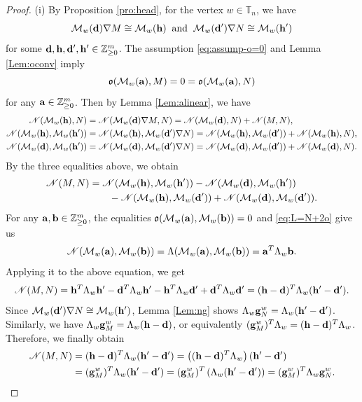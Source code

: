 \documentclass[12pt]{amsart}
\theoremstyle{definition}
\theoremstyle{remark}
\numberwithin{equation}{section}
\begin{document}
\begin{proof}
(i) By Proposition \ref{pro:head},  for the vertex $w\in\mathbb T_n$, we have 
\[
\mathcal{M}_{w}({\bf d}) \nabla M \cong \mathcal{M}_{w}({\bf h}) \;\; \text{and}\;\;\mathcal{M}_w({\bf d}') \nabla N \cong \mathcal{M}_{w}({\bf h}')
\]
for some ${\bf d,h,d',h'} \in \mathbb{Z}_{\ge 0}^m$.
The assumption \eqref{eq:assump-o=0} and Lemma \ref{Lem:oconv} imply \[\mathfrak{o}(\mathcal M_w({\bf a}), M)=0=\mathfrak{o}(\mathcal M_w({\bf a}), N)\] for any ${\bf a}\in\mathbb Z_{\geq 0}^m$.  Then by Lemma \ref{Lem:alinear}, we have
\begin{align}
  \mathscr{N}(\mathcal{M}_{w}({\bf h}),N) &=\mathscr{N}(\mathcal{M}_{w}({\bf d}) \nabla M,N)= \mathscr{N}(\mathcal{M}_{w}({\bf d}),N)+ \mathscr{N}(M,N),\nonumber\\
    \mathscr{N}(\mathcal{M}_{w}({\bf h}),\mathcal M_w({\bf h'})) &= \mathscr{N}(\mathcal{M}_{w}({\bf h}),\mathcal M_w({\bf d'})\nabla N)= \mathscr{N}(\mathcal{M}_{w}({\bf h}), \mathcal M_w({\bf d'}))+ \mathscr{N}(\mathcal{M}_{w}({\bf h}), N),\nonumber\\
     \mathscr{N}(\mathcal{M}_{w}({\bf d}),\mathcal M_w({\bf h'})) &= \mathscr{N}(\mathcal{M}_{w}({\bf d}),\mathcal M_w({\bf d'})\nabla N)= \mathscr{N}(\mathcal{M}_{w}({\bf d}), \mathcal M_w({\bf d'}))+ \mathscr{N}(\mathcal{M}_{w}({\bf d}), N).\nonumber
\end{align}
By the three equalities above, we obtain
\begin{align}
    \mathscr{N}(M,N) &= \mathscr{N}(\mathcal{M}_{w}({\bf h}), \mathcal{M}_{w}({\bf h'})) - \mathscr{N}(\mathcal{M}_{w}({\bf d}), \mathcal{M}_{w}({\bf h'})) \nonumber\\
    & \qquad -\mathscr{N}(\mathcal{M}_{w}({\bf h}), \mathcal{M}_{w}({\bf d'})) + \mathscr{N}(\mathcal{M}_{w}({\bf d}), \mathcal{M}_{w}({\bf d'})).\nonumber
\end{align}
For any ${\bf a,b} \in \mathbb{Z}_{\ge 0}^m$, the equalities $\mathfrak{o}(\mathcal{M}_{w}({\bf a}), \mathcal{M}_{w}({\bf b}))=0$ and \eqref{eq:L=N+2o} give us
\[\mathscr{N}(\mathcal{M}_{w}({\bf a}), \mathcal{M}_{w}({\bf b})) =\Lambda(\mathcal M_w({\bf a}),\mathcal M_w({\bf b}))={\bf a}^T \Lambda_w{\bf b}.
\]
Applying it to the above equation, we get
\[ \mathscr{N}(M,N) =  {\bf h}^T \Lambda_{w} {\bf h'} -{\bf d}^T \Lambda_{w} {\bf h'}
-{\bf h}^T \Lambda_{w} {\bf d'} +{\bf d}^T \Lambda_{w} {\bf d'} = ({\bf h} - {\bf d})^T \Lambda_{w} ({\bf h'} - {\bf d'}).\]
Since $\mathcal{M}_w({\bf d'}) \nabla N \cong \mathcal{M}_{w}({\bf h'})$, Lemma \ref{Lem:ng} shows $\Lambda_w{\bf g}_N^w=\Lambda_w({\bf h'}-{\bf d'})$. Similarly, we have $\Lambda_w{\bf g}_M^w=\Lambda_w({\bf h}-{\bf d})$, or equivalently $({\bf g}_M^w)^T\Lambda_w=({\bf h}-{\bf d})^T\Lambda_w$.
Therefore, we finally obtain
\begin{align}
    \mathscr{N}(M,N)&=({\bf h} - {\bf d})^T \Lambda_{w} ({\bf h'} - {\bf d'})=\left(({\bf h} - {\bf d})^T \Lambda_{w}\right) ({\bf h'} - {\bf d'})\nonumber\\
    &=({\bf g}_M^w)^T\Lambda_w({\bf h'}-{\bf d'})=({\bf g}_M^w)^T\left(\Lambda_w({\bf h'}-{\bf d'})\right)=({\bf g}_M^w)^T\Lambda_w{\bf g}_N^w.\nonumber
\end{align}


\end{proof}
\end{document}
